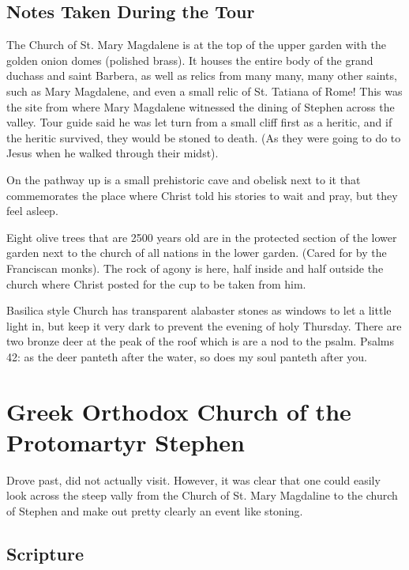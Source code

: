 \documentclass[letterpaper]{report}
\begin{document}
\subsection{Notes Taken During the Tour}
The Church of St. Mary Magdalene is at the top of the upper garden with the golden onion domes (polished brass).
It houses the entire body of the grand duchass and saint Barbera, as well as relics from many many, many other saints, such as Mary Magdalene,
and even a small relic of St. Tatiana of Rome! This was the site from where Mary Magdalene witnessed the dining of Stephen across the valley. Tour guide said he was let turn from a small cliff first as a heritic, and if the heritic survived, they would be stoned to death. (As they were going to do to Jesus when he walked through their midst).

On the pathway up is a small prehistoric cave and obelisk next to it that commemorates the place where Christ told his stories to wait and pray, but they feel asleep.

Eight olive trees that are 2500 years old are in the protected section of the lower garden next to the church of all nations in the lower garden. (Cared for by the Franciscan monks). The rock of agony is here, half inside and half outside the church where Christ posted for the cup to be taken from him.

Basilica style Church has transparent alabaster stones as windows to let a little light in, but keep it very dark to prevent the evening of holy Thursday.
There are two bronze deer at the peak of the roof which is are a nod to the psalm.
Psalms 42: as the deer panteth after the water, so does my soul panteth after you.

\clearpage
\section{Greek Orthodox Church of the Protomartyr Stephen}
\begin{multicols}{2}
	Drove past, did not actually visit.
 However, it was clear that one could easily look across the steep vally from the Church of St. Mary Magdaline to the church of Stephen and make out pretty clearly an event like stoning.
\end{multicols}
\subsection{Scripture}
\end{document}
